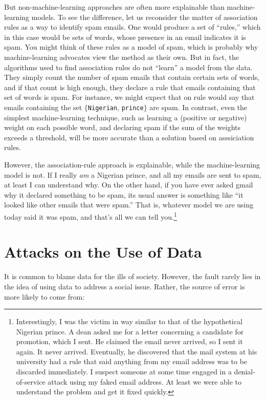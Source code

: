 \documentclass[11pt]{article}
\begin{document}
But non-machine-learning approaches are often more explainable than machine-learning models.  To see the difference, let us reconsider the matter of association rules as a way to identify spam emails.  One would produce a set of ``rules,'' which in this case would be sets of words, whose presence in an email indicates it is spam.  You might think of these rules as a model of spam, which is probably why machine-learning advocates view the method as their own.  But in fact, the algorithms used to find association rules do not ``learn'' a model from the data.  They simply count the number of spam emails that contain certain sets of words, and if that count is high enough, they declare a rule that emails containing that set of words is spam.  For instance, we might expect that on rule would say that emails containing the set $\{${\tt Nigerian}, {\tt prince}$\}$ are spam.  In contrast, even the simplest machine-learning technique, such as learning a (positive or negative) weight on each possible word, and declaring spam if the sum of the weights exceeds a threshold, will be more accurate than a solution based on asssiciation rules.

However, the association-rule approach is explainable, while the machine-learning model is not.  If I really {\em am} a Nigerian prince, and all my emails are sent to spam, at least I can understand why.  On the other hand, if you have ever asked gmail why it declared something to be spam, its usual answer is something like ``it looked like other emails that were spam.''  That is, whatever model we are using today said it was spam, and that's all we can tell you.\footnote{Interestingly, I was the victim in way similar to that of the hypothetical Nigerian prince.  A dean asked me for a letter concerning a candidate for promotion, which I sent.  He claimed the email never arrived, so I sent it again.  It never arrived.  Eventually, he discovered that the mail system at his university had a rule that said anything from my email address was to be discarded immediately.  I suspect someone at some time engaged in a denial-of-service attack using my faked email address.  At least we were able to understand the problem and get it fixed quickly.}

\section{Attacks on the Use of Data}

It is common to blame data for the ills of society.  However, the fault rarely lies in the idea of using data to address a social issue.  Rather, the source of error is more likely to come from:
\end{document}
